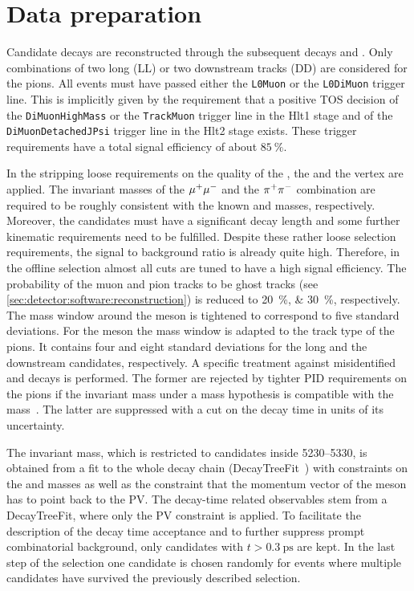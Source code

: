 
\section{Data preparation}
\label{sec:bd2jpsiks:datapreparation}


Candidate \BdToJPsiKS decays are reconstructed through the subsequent decays
\mbox{\JPsiToMuMu} and \KSToPiPi. Only combinations of two long (LL) or two
downstream tracks (DD) are considered for the pions. All events must have passed
either the \texttt{L0Muon} or the \texttt{L0DiMuon} trigger line. This is
implicitly given by the requirement that a positive \jpsi TOS
decision of the \texttt{DiMuonHighMass} or the \texttt{TrackMuon} trigger line
in the Hlt1 stage and of the \texttt{DiMuonDetachedJPsi} trigger line in the
Hlt2 stage exists. These trigger requirements have a total signal efficiency
of about $\SI{85}{\percent}$.

In the stripping loose requirements on the quality of the \jpsi, the \KS and
the \Bd vertex are applied. The invariant masses of the ${\mu^+\mu^-}$ and the
${{\pi}^+}{{\pi}^-}$ combination are required to be roughly consistent with the known
\jpsi and \KS masses, respectively. Moreover, the \KS candidates must have a
significant decay length and some further kinematic requirements need to be
fulfilled. Despite these rather loose selection requirements, the signal to
background ratio is already quite high. Therefore, in the offline selection
almost all cuts are tuned to have a high signal efficiency. The probability of
the muon and pion tracks to be ghost tracks (see
\cref{sec:detector:software:reconstruction}) is reduced to
\SIlist{20;30}{\percent}, respectively. The mass window around the \jpsi meson
is tightened to correspond to five standard deviations. For the \KS meson the
mass window is adapted to the track type of the pions. It contains four and
eight standard deviations for the long and the downstream candidates,
respectively. A specific treatment against misidentified \LbToJPsiL and
\BdToJPsiKstar decays is performed. The former are rejected by tighter PID
requirements on the pions if the invariant mass under a \pion\proton mass
hypothesis is compatible with the \Lz mass~\cite{PDG2014}. The latter
are suppressed with a cut on the \KS decay time in units of its uncertainty.

The invariant \Bd mass, which is restricted to candidates inside
\SIrange{5230}{5330}{\MeVcc}, is obtained from a fit to the whole decay chain
(DecayTreeFit~\cite{Hulsbergen:2005pu}) with constraints on the \jpsi and \KS
masses as well as the constraint that the momentum vector of the \Bd meson has
to point back to the PV. The decay-time related observables stem from a
DecayTreeFit, where only the PV constraint is applied. To facilitate the
description of the decay time acceptance and to further suppress prompt
combinatorial background, only candidates with $t > \SI{0.3}{\ps}$ are kept.
In the last step of the selection one candidate is chosen randomly for events
where multiple candidates have survived the previously described selection.
